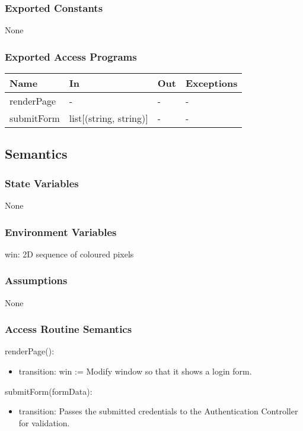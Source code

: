 \documentclass[12pt, titlepage]{article}
\begin{document}
\subsubsection{Exported Constants}
None
\subsubsection{Exported Access Programs}

\begin{center}
\begin{tabular}{p{2cm} p{4cm} p{4cm} p{2cm}}
\hline
\textbf{Name} & \textbf{In} & \textbf{Out} & \textbf{Exceptions} \\
\hline
renderPage & - & - & - \\
submitForm & list[(string, string)] & - & - \\
\hline
\end{tabular}
\end{center}

\subsection{Semantics}

\subsubsection{State Variables}
None
\subsubsection{Environment Variables}
win: 2D sequence of coloured pixels

\subsubsection{Assumptions}
None

\subsubsection{Access Routine Semantics}

\noindent renderPage():
\begin{itemize}
\item transition: win := Modify window so that it shows a login form.
\end{itemize}

\noindent submitForm(formData):
\begin{itemize}
\item transition: Passes the submitted credentials to the Authentication Controller for validation.
\end{itemize}
\end{document}
